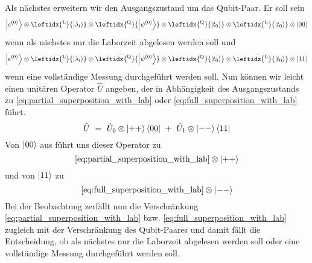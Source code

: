 \documentclass[12pt]{article}
\begin{document}
Als nächstes erweitern wir den Ausgangszustand um das Qubit-Paar. Er soll sein 
\begin{equation*}
\ket{e^{(0)}} 
\otimes \leftidx{^\mathrm{L}}{\ket{\lambda_l}} 
\otimes \leftidx{^\mathrm{Q}}{\ket{\psi^{(0)}}}
\otimes \leftidx{^\mathrm{Q}}{\ket{t_0}}
\otimes \leftidx{^\mathrm{L}}{\ket{t_0}}
\otimes \ket{00}
\end{equation*}
wenn als nächstes nur die Laborzeit abgelesen werden soll und 
\begin{equation*}
\ket{e^{(0)}} 
\otimes \leftidx{^\mathrm{L}}{\ket{\lambda_l}} 
\otimes \leftidx{^\mathrm{Q}}{\ket{\psi^{(0)}}}
\otimes \leftidx{^\mathrm{Q}}{\ket{t_0}}
\otimes \leftidx{^\mathrm{L}}{\ket{t_0}}
\otimes \ket{11}
\end{equation*}
wenn eine vollständige Messung durchgeführt werden soll. Nun können wir leicht einen unitären Operator $\hat{U}$ angeben, der in Abhängigkeit des Ausgangszustands zu \eqref{eq:partial_superposition_with_lab} oder \eqref{eq:full_superposition_with_lab} führt.
\begin{equation*}
\hat{U}\ =\ \hat{U}_0 \otimes \ket{++}\bra{00}\ +\ \hat{U}_1 \otimes \ket{--}\bra{11}
\end{equation*}
Von $\ket{00}$ aus führt uns dieser Operator zu 
\begin{equation*}
\eqref{eq:partial_superposition_with_lab} \otimes \ket{++}
\end{equation*}
und von $\ket{11}$ zu 
\begin{equation*}
\eqref{eq:full_superposition_with_lab} \otimes \ket{--}
\end{equation*}
Bei der Beobachtung zerfällt nun die Verschränkung \eqref{eq:partial_superposition_with_lab} bzw. \eqref{eq:full_superposition_with_lab} zugleich mit der Verschränkung des Qubit-Paares und damit fällt die Entscheidung, ob als nächstes nur die Laborzeit abgelesen werden soll oder eine vollständige Messung durchgeführt werden soll. 
\end{document}
